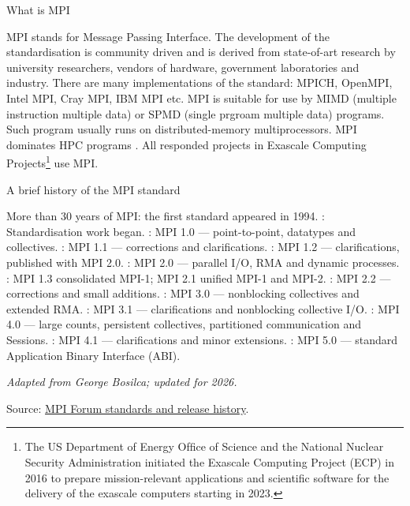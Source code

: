\documentclass[xcolor=dvipsnames]{beamer}
\begin{document}
\begin{frame}{What is MPI}
\begin{outline}
    \1 MPI stands for Message Passing Interface.
    \2 The development of the standardisation is community driven and is derived from state-of-art research by university researchers, vendors of hardware, government laboratories and industry.
    \pause
    \2 There are many implementations of the standard: MPICH, OpenMPI, Intel MPI, Cray MPI, IBM MPI etc.
    \1 MPI is suitable for use by MIMD (multiple instruction multiple data)  or SPMD (single prgroam multiple data) programs.
    \2 Such program usually runs on distributed-memory multiprocessors.
    \pause
    \1 MPI dominates HPC programs \cite{evans2022survey}.
    \2 All responded projects in Exascale Computing Projects\footnote{The US Department of Energy Ofﬁce of Science and the National Nuclear Security Administration initiated the Exascale
Computing Project (ECP) in 2016 to prepare mission-relevant applications and scientiﬁc software for the delivery of the
exascale computers starting in 2023.} use MPI.
\end{outline}
\end{frame}

\begin{frame}{A brief history of the MPI standard}
\small
\begin{outline}
\1 More than 30 years of MPI: the first standard appeared in 1994.
: Standardisation work began.
: MPI 1.0 --- point-to-point, datatypes and collectives.
: MPI 1.1 --- corrections and clarifications.
: MPI 1.2 --- clarifications, published with MPI 2.0.
: MPI 2.0 --- parallel I/O, RMA and dynamic processes.
: MPI 1.3 consolidated MPI-1; MPI 2.1 unified MPI-1 and MPI-2.
: MPI 2.2 --- corrections and small additions.
: MPI 3.0 --- nonblocking collectives and extended RMA.
: MPI 3.1 --- clarifications and nonblocking collective I/O.
: MPI 4.0 --- large counts, persistent collectives,\newline
    partitioned communication and Sessions.
: MPI 4.1 --- clarifications and minor extensions.
: MPI 5.0 --- standard Application Binary Interface (ABI).
\end{outline}
\footnotesize\textit{Adapted from George Bosilca; updated for 2026.}\par
\footnotesize Source: \href{https://www.mpi-forum.org/docs/}{MPI Forum standards and release history}.
\end{frame}
\end{document}
